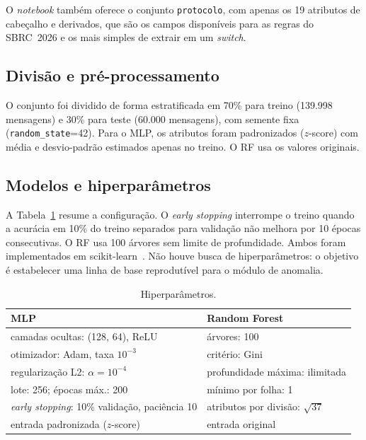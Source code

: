 \documentclass[12pt]{article}
\begin{document}
O \textit{notebook} também oferece o conjunto \texttt{protocolo}, com apenas os
19 atributos de cabeçalho e derivados, que são os campos disponíveis para as
regras do SBRC~2026 e os mais simples de extrair em um \textit{switch}.

\subsection{Divisão e pré-processamento}

O conjunto foi dividido de forma estratificada em 70\% para treino (139.998
mensagens) e 30\% para teste (60.000 mensagens), com semente fixa
(\texttt{random\_state}=42). Para o MLP, os atributos foram padronizados
($z$-score) com média e desvio-padrão estimados apenas no treino. O RF usa os
valores originais. 

\subsection{Modelos e hiperparâmetros}

A Tabela~\ref{tab:hiper} resume a configuração. O \textit{early stopping} interrompe o treino quando a
acurácia em 10\% do treino separados para validação não melhora por 10 épocas
consecutivas. O RF usa 100 árvores sem limite de profundidade. Ambos foram
implementados em scikit-learn~\cite{pedregosa2011scikit}. Não houve busca de
hiperparâmetros: o objetivo é estabelecer uma linha de base reprodutível para
o módulo de anomalia.

\begin{table}[!htbp]
\centering
\caption{Hiperparâmetros.}
\label{tab:hiper}
\small
\begin{tabular}{ll}
\toprule
MLP & Random Forest\\
\midrule
camadas ocultas: (128, 64), ReLU & árvores: 100\\
otimizador: Adam, taxa $10^{-3}$ & critério: Gini\\
regularização L2: $\alpha = 10^{-4}$ & profundidade máxima: ilimitada\\
lote: 256; épocas máx.: 200 & mínimo por folha: 1\\
\textit{early stopping}: 10\% validação, paciência 10 & atributos por divisão: $\sqrt{37}$\\
entrada padronizada ($z$-score) & entrada original\\
\bottomrule
\end{tabular}
\end{table}
\end{document}

